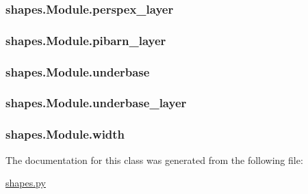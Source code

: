 \subsubsection[{perspex\+\_\+layer}]{\setlength{\rightskip}{0pt plus 5cm}shapes.\+Module.\+perspex\+\_\+layer}\label{classshapes_1_1_module_a402a64427f8ffe5f46611459ea497776}
\hypertarget{classshapes_1_1_module_aa5f8f21ac48d755e251e1bf33c42c1ec}{}
\subsubsection[{pibarn\+\_\+layer}]{\setlength{\rightskip}{0pt plus 5cm}shapes.\+Module.\+pibarn\+\_\+layer}\label{classshapes_1_1_module_aa5f8f21ac48d755e251e1bf33c42c1ec}
\hypertarget{classshapes_1_1_module_ac05cf9348ab70df94cbe4f1eadb191e1}{}
\subsubsection[{underbase}]{\setlength{\rightskip}{0pt plus 5cm}shapes.\+Module.\+underbase}\label{classshapes_1_1_module_ac05cf9348ab70df94cbe4f1eadb191e1}
\hypertarget{classshapes_1_1_module_a83b5d6a540e5ee42db561e0bc8569562}{}
\subsubsection[{underbase\+\_\+layer}]{\setlength{\rightskip}{0pt plus 5cm}shapes.\+Module.\+underbase\+\_\+layer}\label{classshapes_1_1_module_a83b5d6a540e5ee42db561e0bc8569562}
\hypertarget{classshapes_1_1_module_a3ed342ba3d585a3efb51ebbf4679720f}{}
\subsubsection[{width}]{\setlength{\rightskip}{0pt plus 5cm}shapes.\+Module.\+width}\label{classshapes_1_1_module_a3ed342ba3d585a3efb51ebbf4679720f}


The documentation for this class was generated from the following file\+:\begin{DoxyCompactItemize}
\item 
\hyperlink{shapes_8py}{shapes.\+py}\end{DoxyCompactItemize}
